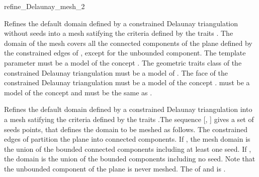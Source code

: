 \begin{ccRefFunction}{refine_Delaunay_mesh_2}


{ Refines the default domain defined by a constrained Delaunay
  triangulation without seeds into a mesh satifying the criteria
  defined by the traits . The domain of the mesh
  covers all the connected components of the plane defined by the
  constrained edges of , except for the unbounded component.
  \ccPrecond The template parameter  must be a model of the
  concept . The geometric traits
  class of the constrained Delaunay triangulation must be a model
  of .
  \ccRequire The face of the constrained
  Delaunay triangulation must be a model of the concept
  .  must be a model of the
  concept  and  must be the same
  as . }

                     { Refines the default domain defined by a constrained
                       Delaunay triangulation into a mesh
                       satifying the criteria defined by the traits
                       .The sequence [, ]
                       gives a set of seeds points, that defines the domain
                       to be meshed as follows. The constrained edges of
                        partition the plane into connected components.
                       If , the mesh domain is the union of
                       the bounded connected components including at least
                       one seed. If , the domain is the
                       union of the bounded components including no seed.
                       Note that the unbounded component of the plane is
                       never meshed.
                       \ccRequire The  of  and
                        is .}

\end{ccRefFunction}

